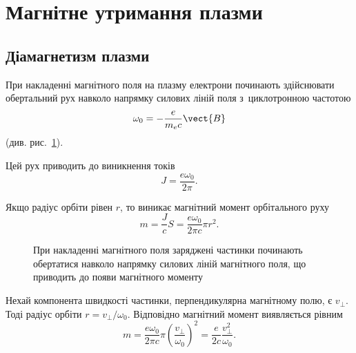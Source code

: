 \section{Магнітне утримання плазми}\label{sec:magnetic-confinement}\hypertarget{magnetic-confinement}{}

\subsection{Діамагнетизм плазми}

При накладенні магнітного поля на плазму електрони починають здійснювати обертальний рух навколо напрямку силових ліній поля з~циклотронною частотою
\begin{equation*}
	\omega_0 = -\frac{e}{m_e c}\vect{B}
\end{equation*}
(див. рис.~\ref{pic:cyclotron-motion}).

Цей рух приводить до виникнення токів
\begin{equation*}
	J = \frac{e\omega_0}{2\pi}.
\end{equation*}

Якщо радіус орбіти рівен $r$, то виникає магнітний момент орбітального руху
\begin{equation*}
	m = \frac{J}{c}S = \frac{e\omega_0}{2\pi c}\pi r^2.
\end{equation*}

\begin{figure}[h!]\centering
	\caption{При накладенні магнітного поля заряджені частинки починають обертатися навколо напрямку силових ліній магнітного поля, що приводить до появи магнітного моменту}
	\label{pic:cyclotron-motion}
\end{figure}

Нехай компонента швидкості частинки, перпендикулярна магнітному полю, є $v_\perp$. Тоді радіус орбіти $r = v_\perp/\omega_0$. Відповідно магнітний момент виявляється рівним
\begin{equation*}
	m = \frac{e\omega_0}{2\pi c}\pi\left(\frac{v_\perp}{\omega_0}\right)^2 = \frac{e}{2c}\frac{v_\perp^2}{\omega_0}.
\end{equation*}

